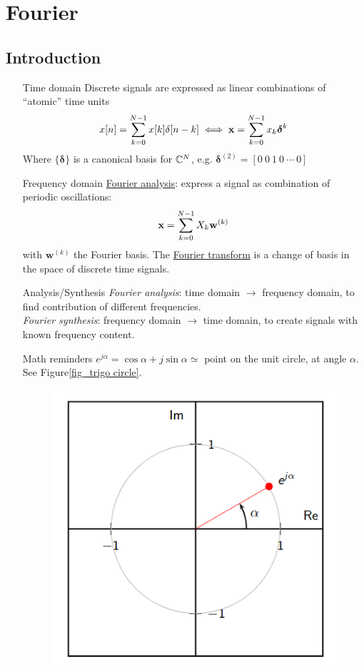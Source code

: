 \documentclass[11pt,a4paper]{article}
\begin{document}
\section{Fourier}
\subsection{Introduction}
\begin{itemize}
	\item[Time domain]Discrete signals are expressed as linear combinations of ``atomic'' time units
	      \[x[n] = \somme{N-1}{k=0}x[k]\delta[n-k] \iff \mathbf{x} = \somme{N-1}{k=0}x_k \boldsymbol{\delta}^k\]
	      Where $\{\boldsymbol{\delta}\}$ is a canonical basis for $\C^N$, e.g. $\boldsymbol{\delta}^{(2)} = [0\ 0\ 1\ 0\ \cdots\ 0]$
	\item[Frequency domain] \uline{Fourier analysis}: express a signal as combination of periodic oscillations:
	      \begin{equation}
		      \mathbf{x} = \somme{N-1}{k=0} X_k \mathbf{w}^{(k)}
	      \end{equation}
	      with $\mathbf{w}^{(k)}$ the Fourier basis. The \uline{Fourier transform} is a change of basis in the space of discrete time signals.
	\item[Analysis/Synthesis]
	      \textit{Fourier analysis}: time domain $\to$ frequency domain, to find contribution of different frequencies.\\
	      \textit{Fourier synthesis}: frequency domain $\to$ time domain, to create signals with known frequency content.
	\item[Math reminders] $e^{j\alpha} = \cos\alpha + j\sin\alpha \simeq$ point on the unit circle, at angle $\alpha$. See Figure\ref{fig_trigo circle}.
	      \begin{figure}
		      \centering
		      \includegraphics[scale=0.4]{images/trigo_circle}

\end{figure}
\end{itemize}
\end{document}
